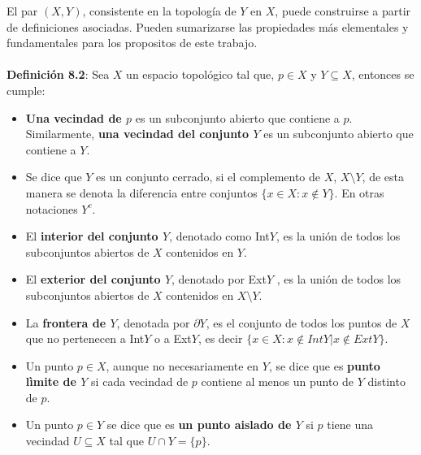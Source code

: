 \documentclass{report}
\begin{document}
El par $(X,Y)$, consistente en la topolog\'ia de $Y$ en $X$, puede construirse a partir de definiciones asociadas. Pueden sumarizarse las propiedades m\'as elementales y fundamentales para los propositos de este trabajo.\\
\\

\textbf{Definici\'on 8.2}: Sea $X$ un espacio topol\'ogico tal que, $p \in X$ y $Y \subseteq X$, entonces se cumple:

\begin{itemize}

\item \textbf{Una vecindad de $p$} es un subconjunto abierto que contiene a $p$. Similarmente, \textbf{una vecindad del conjunto $Y$} es un subconjunto abierto que contiene a $Y$.\\

\item Se dice que $Y$ es un conjunto cerrado, si el complemento de $X$, $X \setminus Y$, de esta manera se denota la diferencia entre conjuntos $\lbrace x \in X : x \not\in Y\rbrace$. En otras notaciones $Y^{c}$.\\

\item El \textbf{interior del conjunto $Y$}, denotado como Int$Y$, es la uni\'on de todos los subconjuntos abiertos de $X$ contenidos en $Y$.\\

\item El \textbf{exterior del conjunto $Y$}, denotado por Ext$Y$ , es la uni\'on de todos los subconjuntos abiertos de $X$ contenidos en $X \setminus Y$.\\

\item La \textbf{frontera de $Y$}, denotada por $\partial Y$, es el conjunto de todos los puntos de $X$ que no pertenecen a Int$Y$ o a Ext$Y$, es decir $\lbrace x \in X : x \not\in Int Y |x \not\in Ext Y\rbrace$.\\

\item Un punto $p \in X$, aunque no necesariamente en $Y$, se dice que es \textbf{punto lìmite de $Y$} si cada vecindad de $p$ contiene al menos un punto de $Y$ distinto de $p$.\\

\item Un punto $p \in Y$ se dice que es \textbf{un punto aislado de $Y$} si $p$ tiene una vecindad $U \subseteq X$ tal que $U \cap Y = \lbrace p \rbrace$.\\


\end{itemize}
\end{document}
